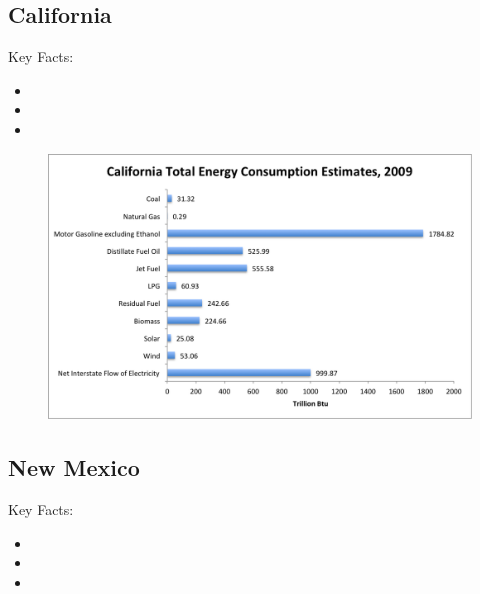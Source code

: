 \documentclass[12pt]{article}
\begin{document}
\newpage

\subsection{California}

\Large Key Facts:

\normalsize

\begin{itemize}

\item

\item

\item

\end{itemize}

\begin{figure}[!b]
    \centering
    \includegraphics[width=\linewidth]{CaliforniaQuickGraph}
\end{figure}

\newpage

\subsection{New Mexico}

\Large Key Facts:

\normalsize

\begin{itemize}

\item

\item

\item

\end{itemize}
\end{document}
